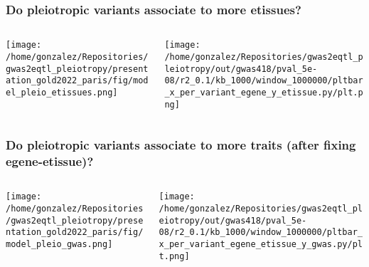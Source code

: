 \documentclass{beamer}
\begin{document}
\begin{frame}
\frametitle{Do pleiotropic variants associate to more etissues?}

\begin{columns}
\begin{column}{0.5\textwidth}
    \begin{center}
\texttt{[image: /home/gonzalez/Repositories/gwas2eqtl\_pleiotropy/presentation\_gold2022\_paris/fig/model\_pleio\_etissues.png]}
     \end{center}
\end{column}
\begin{column}{0.5\textwidth}  %
    \begin{center}
\texttt{[image: /home/gonzalez/Repositories/gwas2eqtl\_pleiotropy/out/gwas418/pval\_5e-08/r2\_0.1/kb\_1000/window\_1000000/pltbar\_x\_per\_variant\_egene\_y\_etissue.py/plt.png]}
     \end{center}
\end{column}
\end{columns}

\end{frame}

\begin{frame}
\frametitle{Do pleiotropic variants associate to more traits (after fixing egene-etissue)?}

\begin{columns}
\begin{column}{0.5\textwidth}
    \begin{center}
\texttt{[image: /home/gonzalez/Repositories/gwas2eqtl\_pleiotropy/presentation\_gold2022\_paris/fig/model\_pleio\_gwas.png]}
     \end{center}
\end{column}
\begin{column}{0.5\textwidth}  %
    \begin{center}
\texttt{[image: /home/gonzalez/Repositories/gwas2eqtl\_pleiotropy/out/gwas418/pval\_5e-08/r2\_0.1/kb\_1000/window\_1000000/pltbar\_x\_per\_variant\_egene\_etissue\_y\_gwas.py/plt.png]}
     \end{center}
\end{column}
\end{columns}

\end{frame}
\end{document}
